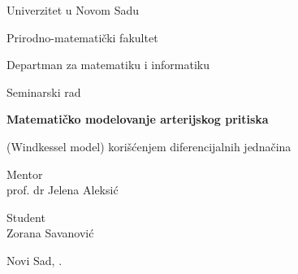 \documentclass[12pt,a4paper]{article}
\begin{document}
\begin{titlepage}
\centering

\begin{minipage}{0.45\textwidth}
    \centering
\end{minipage}
\hfill
\begin{minipage}{0.45\textwidth}
    \centering
\end{minipage}

\vspace{1.5cm}

{\large Univerzitet u Novom Sadu\par}
\vspace{0.3cm}
{\large Prirodno-matematički fakultet\par}
\vspace{0.3cm}
{\large Departman za matematiku i informatiku\par}

\vspace{3cm}

{\large Seminarski rad\par}
\vspace{1cm}

{\Huge\bfseries Matematičko modelovanje arterijskog pritiska\par}
\vspace{0.4cm}
{\Large (Windkessel model) korišćenjem diferencijalnih jednačina\par}

\vspace{4cm}

\begin{minipage}{0.45\textwidth}
    \centering
    Mentor\\[0.2cm]
    prof. dr Jelena Aleksić
\end{minipage}
\hfill
\begin{minipage}{0.45\textwidth}
    \centering
    Student\\[0.2cm]
    Zorana Savanović
\end{minipage}

\vfill
{\small Novi Sad, \the\year{}.}

\end{titlepage}

\tableofcontents
\newpage
\end{document}
